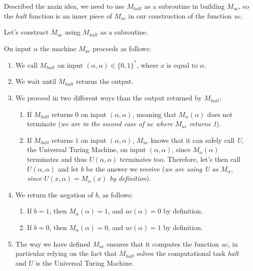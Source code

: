 \begin{example}[title = Undecidability halting problem]
    Described the main idea, we need to use $M_{halt}$ as a subroutine in building $M_{uc}$, so the \textit{halt} function is an inner piece of $M_{uc}$ 
    in our construction of the function \textit{uc}. \vspace{7pt}

    Let's construct $M_{uc}$ using $M_{halt}$ as a subroutine. \vspace{7pt}

    On input $\alpha$ the machine $M_{uc}$ proceeds as follows:
    \begin{enumerate}
        \item We call $M_{halt}$ on input $(\alpha, \alpha) \in \{0,1\}^*$, where $x$ is equal to $\alpha$.
        \item We wait until $M_{halt}$ returns the output.
        \item We proceed in two different ways than the output returned by $M_{halt}$:    
        \begin{enumerate}
            \item If $M_{halt}$ returns $0$ on input $(\alpha, \alpha)$, meaning that $M_{\alpha}(\alpha)$ does not terminate (\textit{we are in the second case of uc where $M_{uc}$ returns 1}).
            \item If $M_{halt}$ returns $1$ on input $(\alpha, \alpha)$, $M_{uc}$ knows that it can safely call \textit{U}, the Universal Turing Machine, on input $(\alpha, \alpha)$, since $M_{\alpha}(\alpha)$ terminates and thus $U(\alpha, \alpha)$ terminates too. Therefore, let's then call $U(\alpha, \alpha)$ and let $b$ be the answer we receive (\textit{we are using U as $M_{\alpha}$, since $U(x, \alpha) = M_{\alpha}(x)$ by definition}).
        \end{enumerate}
        \item We return the negation of $b$, as follows:
        \begin{enumerate}
            \item If $b = 1$, then $M_{\alpha}(\alpha) = 1$, and $uc(\alpha) = 0$ by definition.
            \item If $b = 0$, then $M_{\alpha}(\alpha) = 0$, and $uc(\alpha) = 1$ by definition.
        \end{enumerate}
        \item The way we have defined $M_{uc}$ ensures that it computes the function \textit{uc}, in particular relying on the fact that $M_{halt}$ solves the computational task \textit{halt} and $U$ is the Universal Turing Machine.
    \end{enumerate} \vspace{14pt}


\end{example}

